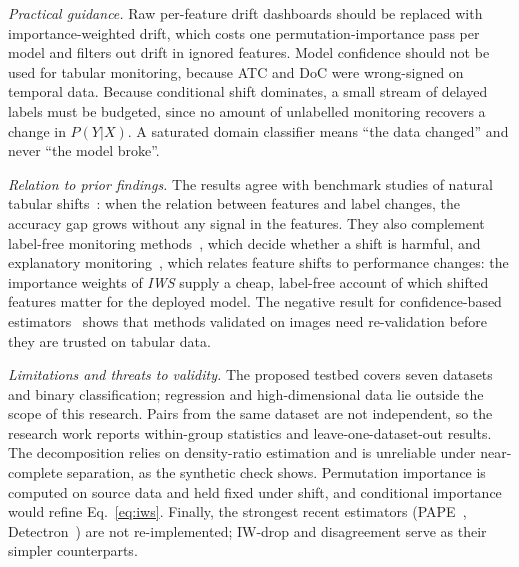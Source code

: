 \documentclass[conference]{IEEEtran}
\theoremstyle{plainhead}
\newcommand{\iws}{\textit{IWS}}
\newcommand{\pp}{\,pp\xspace}
\begin{document}
\begin{table}[t]
\centering
\caption{Failure regimes per dataset (share of evaluations). High drift = domain-classifier AUC $\ge0.75$; harmful = $\Delta>2$\pp; covariate vs.\ conditional by the larger term of Eq.~\eqref{eq:decomp}.}
\label{tab:tax}
\footnotesize
\setlength{\tabcolsep}{3.5pt}

\end{table}

\textit{Practical guidance.} Raw per-feature drift dashboards should be replaced with importance-weighted drift, which costs one permutation-importance pass per model and filters out drift in ignored features. Model confidence should not be used for tabular monitoring, because ATC and DoC were wrong-signed on temporal data. Because conditional shift dominates, a small stream of delayed labels must be budgeted, since no amount of unlabelled monitoring recovers a change in $P(Y|X)$. A saturated domain classifier means ``the data changed'' and never ``the model broke''.

\textit{Relation to prior findings.} The results agree with benchmark studies of natural tabular shifts~\cite{liu2023need,gardner2023tableshift}: when the relation between features and label changes, the accuracy gap grows without any signal in the features. They also complement label-free monitoring methods~\cite{nguyen2025reliably,amoukou2024sequential}, which decide whether a shift is harmful, and explanatory monitoring~\cite{decker2024explanatory}, which relates feature shifts to performance changes: the importance weights of \iws{} supply a cheap, label-free account of which shifted features matter for the deployed model. The negative result for confidence-based estimators~\cite{deng2023confidence,xie2024mano} shows that methods validated on images need re-validation before they are trusted on tabular data.

\textit{Limitations and threats to validity.} The proposed testbed covers seven datasets and binary classification; regression and high-dimensional data lie outside the scope of this research. Pairs from the same dataset are not independent, so the research work reports within-group statistics and leave-one-dataset-out results. The decomposition relies on density-ratio estimation and is unreliable under near-complete separation, as the synthetic check shows. Permutation importance is computed on source data and held fixed under shift, and conditional importance~\cite{chamma2024variable} would refine Eq.~\eqref{eq:iws}. Finally, the strongest recent estimators (PAPE~\cite{bialek2025pape}, Detectron~\cite{ginsberg2023detectron}) are not re-implemented; IW-drop and disagreement serve as their simpler counterparts.
\end{document}
